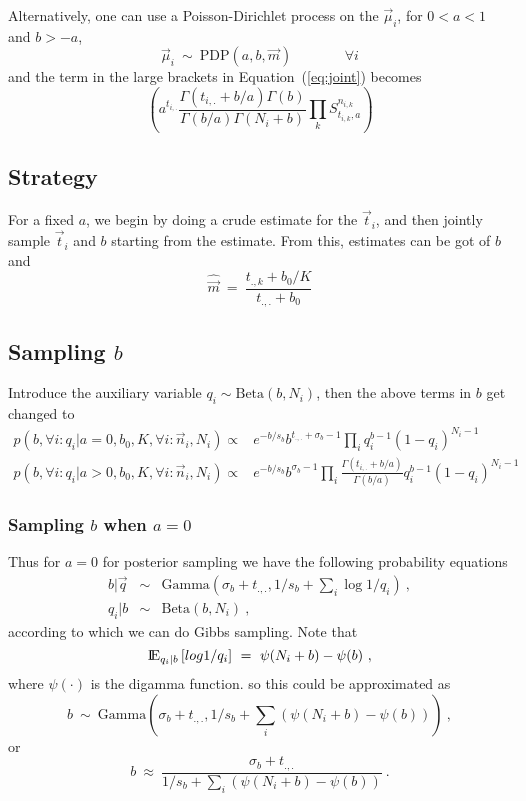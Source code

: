 \documentclass{article}
\def\expec#1#2{{\rm I\!E}_{#1}\left[#2\right]}
\begin{document}
Alternatively, one can use a Poisson-Dirichlet process on the
$\vec\mu_i$, for $0<a<1$ and $b>-a$,
\[
\vec\mu_i ~\sim~ \mbox{PDP}(a,b,\vec{m})~~~~~~~~~~~~~~~~~\forall i
\]
and the term in the large brackets in Equation~(\ref{eq:joint}) becomes
\[
\left( a^{t_{i,.}}\frac{\Gamma(t_{i,.}+b/a)\Gamma(b)}{\Gamma(b/a)\Gamma(N_i+b)} 
               \prod_k S^{n_{i,k}}_{t_{i,k},a} \right)
\]

\subsection{Strategy}

For a fixed $a$, we begin by doing a crude estimate
for the $\vec{t}_i$, and then jointly sample 
$\vec{t}_i$ and $b$ starting from the estimate.
From this, estimates can be got of $b$ and
\[
\widehat{\vec{m}}
~=~
\frac{t_{.,k}+b_0/K}{t_{.,.}+b_0}
\]

\subsection{Sampling $b$}
Introduce the auxiliary variable $q_i\sim \mbox{Beta}(b,N_i)$,
then the above terms in $b$ get changed to
\begin{eqnarray*}
p(b,\forall i : q_i |a=0, b_0,K,\forall i : \vec{n}_i, N_i)
\propto&
e^{- b/s_b}b^{t_{.,.}+\sigma_b-1} \prod_i q_i^{b-1}(1-q_i)^{N_i-1} \\
p(b,\forall i : q_i |a>0, b_0,K,\forall i : \vec{n}_i, N_i)
\propto&
e^{- b/s_b}b^{\sigma_b-1} \prod_i  \frac{\Gamma(t_{i,.}+b/a)}{\Gamma(b/a)}q_i^{b-1}(1-q_i)^{N_i-1} 
\end{eqnarray*}

\subsubsection{Sampling $b$ when $a=0$}
Thus for $a=0$ for posterior sampling we have the following probability equations
\begin{eqnarray*}
b|\vec{q} &\sim & \mbox{Gamma}\left(\sigma_b+t_{.,.},1/s_b+\sum_i \log 1/q_i\right) ~,\\
q_i|b & \sim& \mbox{Beta}(b,N_i)~,
\end{eqnarray*}
according to which we can do Gibbs sampling.
Note that
\[
\expec{q_i|b}{log 1/q_i} ~=~\psi(N_i+b) - \psi(b) ~,
\]
where $\psi(\cdot)$ is the digamma function.
so this could be approximated as
\[
b ~\sim ~ \mbox{Gamma}\left(\sigma_b+t_{.,.}, 1/s_b+
   \sum_i \left( \psi(N_i+b) - \psi(b) \right)\right)~,
\]
or
\[
b~\approx~\frac{\sigma_b+t_{.,.}}{1/s_b+
   \sum_i \left( \psi(N_i+b) - \psi(b) \right)} ~.
\]
\end{document}
